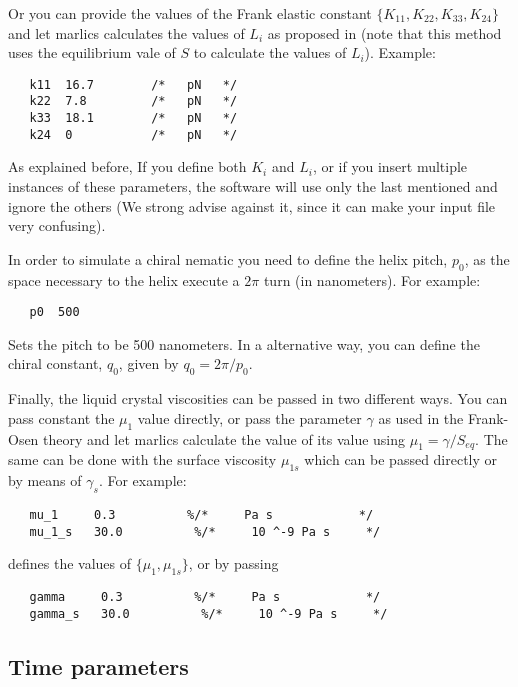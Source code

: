 \documentclass{article}
\begin{document}
Or you can provide the values of the Frank elastic constant
$\lbrace K_{11}, K_{22}, K_{33}, K_{24} \rbrace$ and let marlics
calculates the values of $L_i$ as proposed in \cite{} (note that this
method uses the equilibrium vale of $S$ to calculate the values of
$L_i$). Example:

\begin{lstlisting}
   k11  16.7        /*   pN   */
   k22  7.8         /*   pN   */
   k33  18.1        /*   pN   */
   k24  0           /*   pN   */ 
\end{lstlisting}

As explained before, If you define both $K_i$ and $L_i$, or if you
insert multiple instances of these parameters, the software will use
only the last mentioned and ignore the others (We strong advise
against it, since it can make your input file very confusing).

In order to simulate a chiral nematic you need to define the helix
pitch, $p_0$, as the space necessary to the helix execute a $2 \pi$
turn (in nanometers). For example:

\begin{lstlisting}
   p0  500
\end{lstlisting}
Sets the pitch to be 500 nanometers.  In a alternative way, you can
define the chiral constant, $q_0$, given by $q_0=2 \pi /p_0$. 

Finally, the liquid crystal viscosities can be passed in two different
ways. You can pass constant the $\mu_1$ value directly, or pass the
parameter $\gamma$ as used in the Frank-Osen theory and let marlics
calculate the value of its value using $\mu_1=\gamma/S_{eq}$. The same can be done with the surface
viscosity $\mu_{1s}$ which can be passed directly or by means of $\gamma_s$. For example:
\begin{lstlisting}
   mu_1     0.3          %/*     Pa s            */
   mu_1_s   30.0          %/*     10 ^-9 Pa s     */
\end{lstlisting}
defines the values of $\lbrace \mu_1,\mu_{1s} \rbrace$, or by passing  
\begin{lstlisting}
   gamma     0.3          %/*     Pa s            */
   gamma_s   30.0          %/*     10 ^-9 Pa s     */
\end{lstlisting}


\subsection{Time parameters}\label{time.param}
\end{document}
